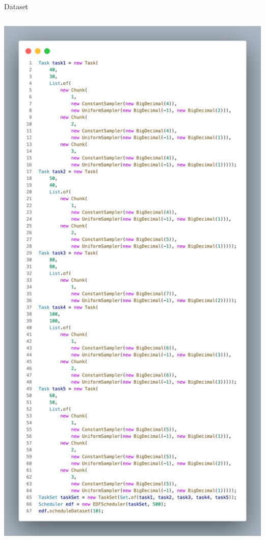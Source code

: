 \begin{frame}{Dataset}
\begin{columns}
\begin{column}{.4\textwidth}
            \includegraphics[width=.7\textwidth]{images/4-dataset/datasetEDF.pdf}
        \end{column}
    \end{columns}
\end{frame}

